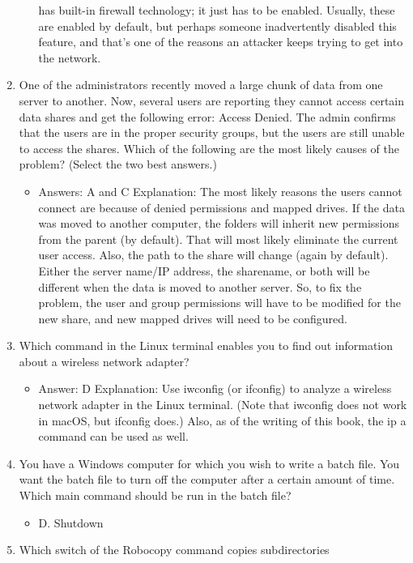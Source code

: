 \documentclass{article}
\begin{document}
\begin{enumerate}
\begin{itemize}
has built-in firewall technology; it just has to be enabled. Usually, these are enabled by
default, but perhaps someone inadvertently disabled this feature, and that’s one of the
reasons an attacker keeps trying to get into the network.
    \end{itemize}
    \item One of the administrators recently moved a large chunk of data
from one server to another. Now, several users are reporting they
cannot access certain data shares and get the following error:
Access Denied. The admin confirms that the users are in the
proper security groups, but the users are still unable to access the
shares. Which of the following are the most likely causes of the
problem? (Select the two best answers.)
    \begin{itemize}
        \item Answers: A and C
Explanation: The most likely reasons the users cannot connect are because of denied
permissions and mapped drives. If the data was moved to another computer, the
folders will inherit new permissions from the parent (by default). That will most likely
eliminate the current user access. Also, the path to the share will change (again by
default). Either the server name/IP address, the sharename, or both will be different
when the data is moved to another server. So, to fix the problem, the user and group
permissions will have to be modified for the new share, and new mapped drives will
need to be configured.
    \end{itemize}
    \item Which command in the Linux terminal enables you to find out
information about a wireless network adapter?
    \begin{itemize}
        \item Answer: D
Explanation: Use iwconfig (or ifconfig) to analyze a wireless network adapter
in the Linux terminal. (Note that iwconfig does not work in macOS, but ifconfig
does.) Also, as of the writing of this book, the ip a command can be used as well.
    \end{itemize}
    \item You have a Windows computer for which you wish to write a batch
file. You want the batch file to turn off the computer after a certain
amount of time. Which main command should be run in the
batch file?
    \begin{itemize}
        \item D. Shutdown
    \end{itemize}
    \item Which switch of the Robocopy command copies subdirectories

\end{enumerate}
\end{document}
